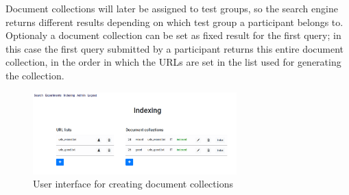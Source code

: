 \documentclass[fleqn]{article}
\begin{document}
Document collections will later be assigned 
to test groups, so the search engine returns different results depending on which test group a participant belongs to. Optionaly
a document collection can be set as fixed result for the first query; in this case the first query submitted by a
participant returns this entire document collection, in the order in which the URLs are set in the list used for generating the collection.

\begin{figure} [h]
\centering
\includegraphics[width=0.7\textwidth]{img/indexingUi}
\caption{User interface for creating document collections}
\label{fig:indexingUi}
\end{figure}
\end{document}
